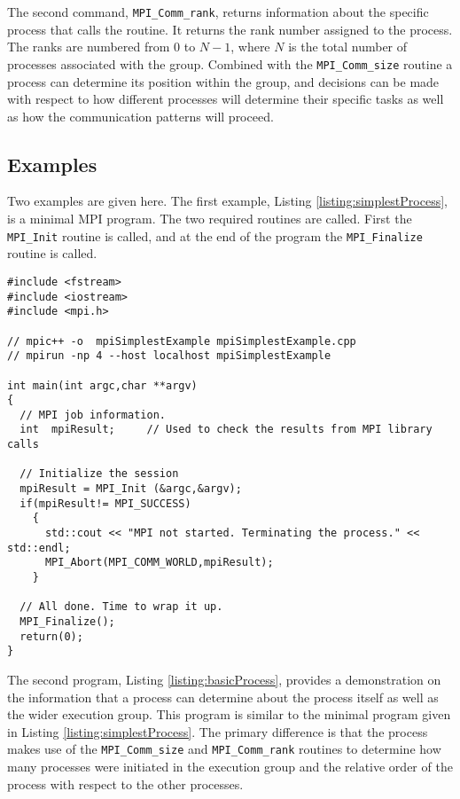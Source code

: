 The second command, \texttt{MPI\_Comm\_rank}, returns information
about the specific process that calls the routine. It returns the rank
number assigned to the process. The ranks are numbered from 0 to
$N-1$, where $N$ is the total number of processes associated with the
group. Combined with the \texttt{MPI\_Comm\_size} routine a process
can determine its position within the group, and decisions can be made
with respect to how different processes will determine their specific
tasks as well as how the communication patterns will proceed.

\subsection{Examples}

Two examples are given here. The first example, Listing
\ref{listing:simplestProcess}, is a minimal MPI program. The two
required routines are called. First the \texttt{MPI\_Init} routine is
called, and at the end of the program the \texttt{MPI\_Finalize}
routine is called.

\lstset{language=C++, numbers=left, numberstyle=\tiny, stepnumber=1,
  numbersep=5pt, commentstyle=\scriptsize}
\begin{lstlisting}[caption={Simplest MPI Program},
                   basicstyle=\scriptsize,
                   label=listing:simplestProcess]
#include <fstream>
#include <iostream>
#include <mpi.h>

// mpic++ -o  mpiSimplestExample mpiSimplestExample.cpp 
// mpirun -np 4 --host localhost mpiSimplestExample

int main(int argc,char **argv)
{
  // MPI job information.
  int  mpiResult;     // Used to check the results from MPI library calls

  // Initialize the session
  mpiResult = MPI_Init (&argc,&argv);
  if(mpiResult!= MPI_SUCCESS)
    {
      std::cout << "MPI not started. Terminating the process." << std::endl;
      MPI_Abort(MPI_COMM_WORLD,mpiResult);
    }

  // All done. Time to wrap it up.
  MPI_Finalize();
  return(0);
}
\end{lstlisting}

The second program, Listing \ref{listing:basicProcess}, provides a
demonstration on the information that a process can determine about
the process itself as well as the wider execution group. This program
is similar to the minimal program given in Listing
\ref{listing:simplestProcess}. The primary difference is that the
process makes use of the \texttt{MPI\_Comm\_size} and
\texttt{MPI\_Comm\_rank} routines to determine how many processes were
initiated in the execution group and the relative order of the process
with respect to the other processes.

